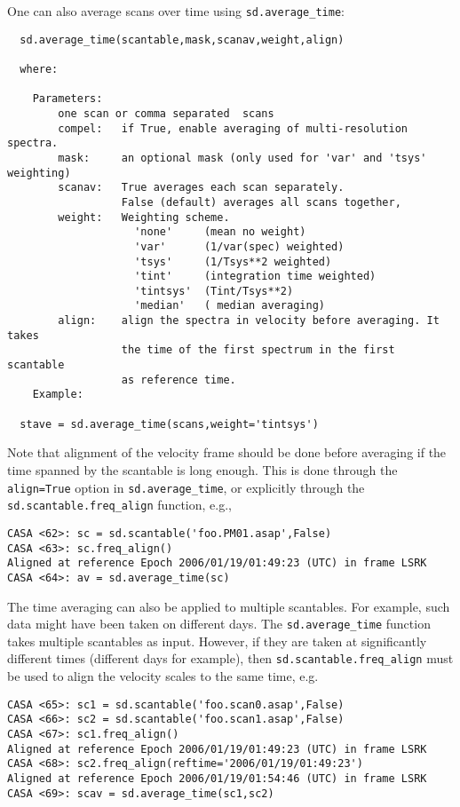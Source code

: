 One can also average scans over time using {\tt sd.average\_time}:
\small
\begin{verbatim}
  sd.average_time(scantable,mask,scanav,weight,align)

  where:

    Parameters:
        one scan or comma separated  scans
        compel:   if True, enable averaging of multi-resolution spectra.
        mask:     an optional mask (only used for 'var' and 'tsys' weighting)
        scanav:   True averages each scan separately.
                  False (default) averages all scans together,
        weight:   Weighting scheme.
                    'none'     (mean no weight)
                    'var'      (1/var(spec) weighted)
                    'tsys'     (1/Tsys**2 weighted)
                    'tint'     (integration time weighted)
                    'tintsys'  (Tint/Tsys**2)
                    'median'   ( median averaging)
        align:    align the spectra in velocity before averaging. It takes
                  the time of the first spectrum in the first scantable
                  as reference time.
    Example:
  
  stave = sd.average_time(scans,weight='tintsys')
\end{verbatim}
\normalsize

Note that alignment of the velocity frame should be done before
averaging if the time spanned by the scantable is 
long enough.  This is done through the {\tt align=True} option in
{\tt sd.average\_time}, or explicitly through the
{\tt sd.scantable.freq\_align} function, e.g.,
\small
\begin{verbatim}
CASA <62>: sc = sd.scantable('foo.PM01.asap',False)
CASA <63>: sc.freq_align()
Aligned at reference Epoch 2006/01/19/01:49:23 (UTC) in frame LSRK
CASA <64>: av = sd.average_time(sc)
\end{verbatim}
\normalsize

The time averaging can also be applied to multiple scantables.  For example, such data
might have been taken on different days.  The
{\tt sd.average\_time} function takes multiple scantables as input.
However, if they are taken at significantly different times (different days for
example), then {\tt sd.scantable.freq\_align} must be used to align
the velocity scales to the same time, e.g.
\small
\begin{verbatim}
CASA <65>: sc1 = sd.scantable('foo.scan0.asap',False)
CASA <66>: sc2 = sd.scantable('foo.scan1.asap',False)
CASA <67>: sc1.freq_align()
Aligned at reference Epoch 2006/01/19/01:49:23 (UTC) in frame LSRK
CASA <68>: sc2.freq_align(reftime='2006/01/19/01:49:23')
Aligned at reference Epoch 2006/01/19/01:54:46 (UTC) in frame LSRK
CASA <69>: scav = sd.average_time(sc1,sc2)
\end{verbatim}
\normalsize

